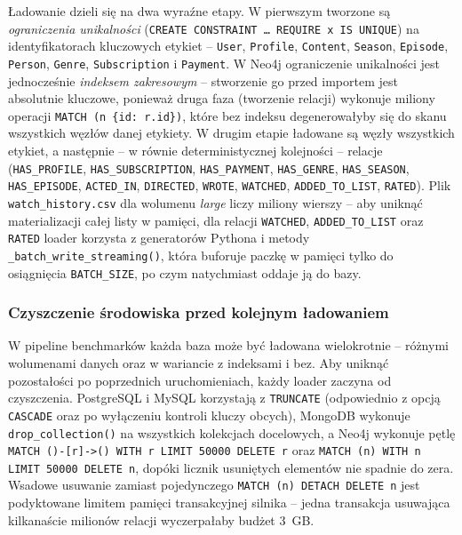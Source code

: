 Ładowanie dzieli się na dwa wyraźne etapy. W pierwszym tworzone
są \emph{ograniczenia unikalności} (\texttt{CREATE CONSTRAINT \dots
REQUIRE x IS UNIQUE}) na identyfikatorach kluczowych etykiet --
\texttt{User}, \texttt{Profile}, \texttt{Content}, \texttt{Season},
\texttt{Episode}, \texttt{Person}, \texttt{Genre},
\texttt{Subscription} i \texttt{Payment}. W Neo4j ograniczenie
unikalności jest jednocześnie \emph{indeksem zakresowym} -- stworzenie
go przed importem jest absolutnie kluczowe, ponieważ druga faza
(tworzenie relacji) wykonuje miliony operacji
\texttt{MATCH~(n~\{id:~r.id\})}, które bez indeksu degenerowałyby
się do skanu wszystkich węzłów danej etykiety. W drugim etapie
ładowane są węzły wszystkich etykiet, a następnie -- w równie
deterministycznej kolejności -- relacje (\texttt{HAS\_PROFILE},
\texttt{HAS\_SUBSCRIPTION}, \texttt{HAS\_PAYMENT}, \texttt{HAS\_GENRE},
\texttt{HAS\_SEASON}, \texttt{HAS\_EPISODE}, \texttt{ACTED\_IN},
\texttt{DIRECTED}, \texttt{WROTE}, \texttt{WATCHED},
\texttt{ADDED\_TO\_LIST}, \texttt{RATED}). Plik \texttt{watch\_history.csv}
dla wolumenu \emph{large} liczy miliony wierszy -- aby uniknąć
materializacji całej listy w pamięci, dla relacji \texttt{WATCHED},
\texttt{ADDED\_TO\_LIST} oraz \texttt{RATED} loader korzysta
z generatorów Pythona i metody \texttt{\_batch\_write\_streaming()},
która buforuje paczkę w pamięci tylko do osiągnięcia \texttt{BATCH\_SIZE},
po czym natychmiast oddaje ją do bazy.

\subsubsection*{Czyszczenie środowiska przed kolejnym ładowaniem}

W pipeline benchmarków każda baza może być ładowana wielokrotnie --
różnymi wolumenami danych oraz w wariancie z indeksami i bez. Aby
uniknąć pozostałości po poprzednich uruchomieniach, każdy loader
zaczyna od czyszczenia. PostgreSQL i MySQL korzystają z \texttt{TRUNCATE}
(odpowiednio z opcją \texttt{CASCADE} oraz po wyłączeniu kontroli
kluczy obcych), MongoDB wykonuje \texttt{drop\_collection()}
na wszystkich kolekcjach docelowych, a Neo4j wykonuje pętlę
\texttt{MATCH~()-[r]->() WITH r LIMIT 50000 DELETE r} oraz
\texttt{MATCH~(n) WITH n LIMIT 50000 DELETE n}, dopóki licznik
usuniętych elementów nie spadnie do zera. Wsadowe usuwanie zamiast
pojedynczego \texttt{MATCH (n) DETACH DELETE n} jest podyktowane
limitem pamięci transakcyjnej silnika -- jedna transakcja usuwająca
kilkanaście milionów relacji wyczerpałaby budżet 3~GB.

